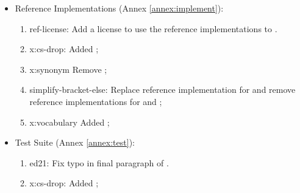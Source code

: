 \begin{itemize}
\begin{enumerate}
			 and  to
			;
		\item \textsf{x:vocabulary}: Added ;
		\end{enumerate}
	\item[E] Reference Implementations (Annex \ref{annex:implement}): %
		\begin{enumerate}
		\item \textsf{ref-license}: Add a license to use the reference
			implementations to .
		\item \textsf{x:cs-drop}: Added ;
		\item \textsf{x:synonym} Remove ; %
		\item \textsf{simplify-bracket-else}: Replace reference implementation for
			 and remove reference implementations
			for  and ;
		\item \textsf{x:vocabulary} Added ;
		\end{enumerate}
	\item[F] Test Suite (Annex \ref{annex:test}):	%
		\begin{enumerate}
		\item \textsf{ed21}: Fix typo in final paragraph of .
		\item \textsf{x:cs-drop}: Added ;
		\end{enumerate}
	\end{itemize}

\endinput



